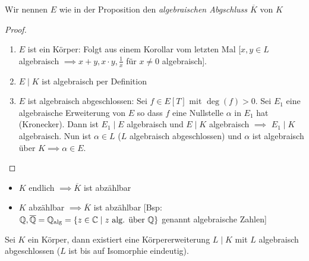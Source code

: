 \begin{definition}
	Wir nennen $E$ wie in der Proposition den \emph{algebraischen Abgschluss $\overline{K}$ } von $K$
\end{definition}

\begin{proof}
	\begin{enumerate}[(1)]
		\item $E$ ist ein Körper: Folgt aus einem Korollar vom letzten Mal [$x,y \in L$ algebraisch $\implies x+y,x\cdot y,\frac{1}{x}$ für $x \neq 0$ algebraisch].
		\item   $E \mid K$ ist algebraisch per Definition
		\item $E$ ist algebraisch abgeschlossen: Sei $f \in E[T]$ mit $\deg(f) > 0$. Sei $E_1$ eine algebraische Erweiterung von $E$ so dass
			$f$ eine Nullstelle $\alpha$ in $E_1$ hat (Kronecker). Dann ist $E_1 \mid E$ algebraisch und $E \mid K$ algebraisch $\implies$ $E_1 \mid K$ algebraisch.
			Nun ist $\alpha \in L$ ($L$ algebraisch abgeschlossen) und $\alpha$ ist algebraisch über $K \implies \alpha \in E$.
	\end{enumerate}
\end{proof}

\begin{remark}
	\begin{itemize}
		\item $K$ endlich $\implies \overline{K}$ ist abzählbar
		\item $K$ abzählbar $\implies \overline{K}$ ist abzählbar [Bsp: $\mathbb{Q}, \overline{\mathbb{Q}} = \mathbb{Q}_{\operatorname{alg}} = \{z \in \mathbb{C} \mid z \text{ alg. über } \mathbb{Q}\}$ genannt algebraische Zahlen]
	\end{itemize}
\end{remark}

\begin{theorem}
	Sei $K$ ein Körper, dann existiert eine Körpererweiterung $L \mid K$ mit $L$ algebraisch abgeschlossen ($L$ ist bis auf Isomorphie eindeutig).
\end{theorem}

